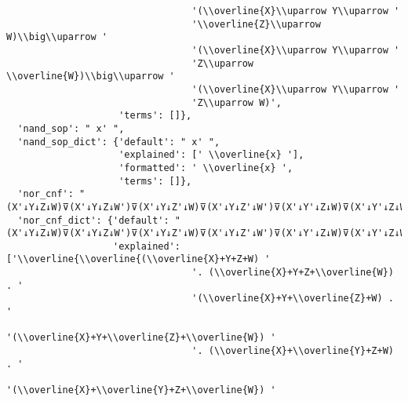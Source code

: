 \begin{verbatim}
                                 '(\\overline{X}\\uparrow Y\\uparrow '
                                 '\\overline{Z}\\uparrow W)\\big\\uparrow '
                                 '(\\overline{X}\\uparrow Y\\uparrow '
                                 'Z\\uparrow \\overline{W})\\big\\uparrow '
                                 '(\\overline{X}\\uparrow Y\\uparrow '
                                 'Z\\uparrow W)',
                    'terms': []},
  'nand_sop': " x' ",
  'nand_sop_dict': {'default': " x' ",
                    'explained': [' \\overline{x} '],
                    'formatted': ' \\overline{x} ',
                    'terms': []},
  'nor_cnf': "(X'↓Y↓Z↓W)⊽(X'↓Y↓Z↓W')⊽(X'↓Y↓Z'↓W)⊽(X'↓Y↓Z'↓W')⊽(X'↓Y'↓Z↓W)⊽(X'↓Y'↓Z↓W')⊽(X'↓Y'↓Z'↓W)⊽(X'↓Y'↓Z'↓W')",
  'nor_cnf_dict': {'default': "(X'↓Y↓Z↓W)⊽(X'↓Y↓Z↓W')⊽(X'↓Y↓Z'↓W)⊽(X'↓Y↓Z'↓W')⊽(X'↓Y'↓Z↓W)⊽(X'↓Y'↓Z↓W')⊽(X'↓Y'↓Z'↓W)⊽(X'↓Y'↓Z'↓W')",
                   'explained': ['\\overline{\\overline{(\\overline{X}+Y+Z+W) '
                                 '. (\\overline{X}+Y+Z+\\overline{W}) . '
                                 '(\\overline{X}+Y+\\overline{Z}+W) . '
                                 '(\\overline{X}+Y+\\overline{Z}+\\overline{W}) '
                                 '. (\\overline{X}+\\overline{Y}+Z+W) . '
                                 '(\\overline{X}+\\overline{Y}+Z+\\overline{W}) '

\end{verbatim}
